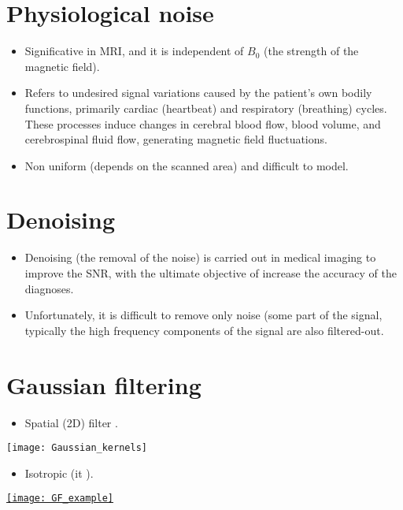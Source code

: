 \section{Physiological noise}
\begin{itemize}
\item Significative in \gls{MRI}, and it is independent of $B_0$ (the
  strength of the magnetic field).
\item Refers to undesired signal variations caused by the patient's
  own bodily functions, primarily cardiac (heartbeat) and respiratory
  (breathing) cycles. These processes induce changes in cerebral blood
  flow, blood volume, and cerebrospinal fluid flow, generating
  magnetic field fluctuations.
\item Non uniform (depends on the scanned area) and difficult to model.
\end{itemize}

\section{Denoising}
\begin{itemize}
\item Denoising (the removal of the noise) is carried out in
  medical imaging to improve the \gls{SNR}, with the ultimate
  objective of increase the accuracy of the diagnoses.
\item Unfortunately, it is difficult to remove only noise (some part
  of the signal, typically the high frequency components of the signal
  are also filtered-out.
\end{itemize}

\section{Gaussian filtering}
\begin{itemize}
\item Spatial (2D) filter  .
\end{itemize}
\vspace{-4ex}
\begin{center}
  \texttt{[image: Gaussian\_kernels]}
\end{center}
\vspace{-4ex}
\begin{itemize}
\item Isotropic (it ).
\end{itemize}
\begin{center}
    \href{https://www.cloudfactory.com/blog/gaussian-noise-medical-ai}{\texttt{[image: GF\_example]}}
\end{center}

